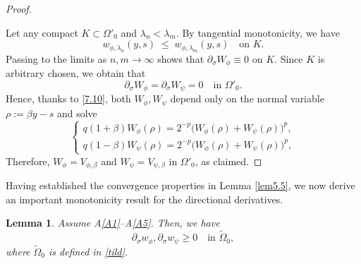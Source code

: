 \documentclass[
  sn-mathphys-num,
  colorlinks,
  linkcolor=darkmagenta,
  citecolor=rufous,
  urlcolor=zaffre,
  hypertexnames=false
]{sn-jnl}
\numberwithin{equation}{section}
\newtheorem{lemma}[theorem]{Lemma}%
\begin{document}
\begin{proof}
\begin{itemize}
\end{itemize}
Let any compact $K\subset\Omega'_0$ and  $\lambda_n<\lambda_m$. By tangential monotonicity, we have
$$
w_{\phi,\lambda_n}(y,s) \;\le\; w_{\phi,\lambda_m}(y,s) \quad \text{on }K.
$$
Passing to the limits as $n,m\to\infty$ shows that $\partial_\sigma W_\phi\equiv 0$ on $K$. Since $K$ is arbitrary chosen, we obtain that
\begin{equation}\label{7.10}
\partial_\sigma W_\phi = \partial_\sigma W_\psi = 0 \quad \text{in } \Omega'_0.
\end{equation}
Hence, thanks to \eqref{7.10}, both $W_\phi,W_\psi$ depend only on the normal variable 
$\rho:=\beta y - s$ and solve 
\begin{equation}
    \left\{
    \begin{aligned}
    q(1+\beta) W_\phi(\rho) = 2^{-p}\big(W_\phi(\rho)+W_\psi(\rho)\big)^p, \\
q(1-\beta) W_\psi(\rho) = 2^{-p}\big(W_\phi(\rho)+W_\psi(\rho)\big)^p,
\end{aligned}
\right.
\end{equation}
Therefore, $W_\phi=V_{\phi,\beta}$ and $W_\psi=V_{\psi,\beta}$ in $\Omega'_0$, as claimed.
\end{proof}
Having established the convergence properties in Lemma \ref{lem5.5}, we now derive an important monotonicity result for the directional derivatives.
\begin{lemma}\label{c7.5}
Assume A\ref{A1}--A\ref{A5}. Then, we have
$$
\partial_\sigma w_\phi, \partial_\sigma w_\psi \geq 0 \quad \text{in } \tilde{\Omega}_0,
$$
where  $\tilde{\Omega}_0$ is defined in \eqref{tild}.
\end{lemma}
\end{document}
